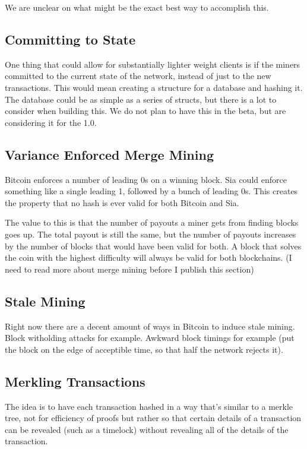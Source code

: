 \documentclass[twocolumn]{article}
\begin{document}
We are unclear on what might be the exact best way to accomplish this.

\subsection{Committing to State}
One thing that could allow for substantially lighter weight clients is if the miners committed to the current state of the network, instead of just to the new transactions.
This would mean creating a structure for a database and hashing it.
The database could be as simple as a series of structs, but there is a lot to consider when building this.
We do not plan to have this in the beta, but are considering it for the 1.0.

\subsection{Variance Enforced Merge Mining}
Bitcoin enforces a number of leading 0s on a winning block.
Sia could enforce something like a single leading 1, followed by a bunch of leading 0s.
This creates the property that no hash is ever valid for both Bitcoin and Sia.

The value to this is that the number of payouts a miner gets from finding blocks goes up.
The total payout is still the same, but the number of payouts increases by the number of blocks that would have been valid for both.
A block that solves the coin with the highest difficulty will always be valid for both blockchains.
(I need to read more about merge mining before I publish this section)

\subsection{Stale Mining}
Right now there are a decent amount of ways in Bitcoin to induce stale mining.
Block witholding attacks for example.
Awkward block timings for example (put the block on the edge of acceptible time, so that half the network rejects it).

\subsection{Merkling Transactions}
The idea is to have each transaction hashed in a way that's similar to a merkle tree, not for efficiency of proofs but rather so that certain details of a transaction can be revealed (such as a timelock) without revealing all of the details of the transaction.
\end{document}
